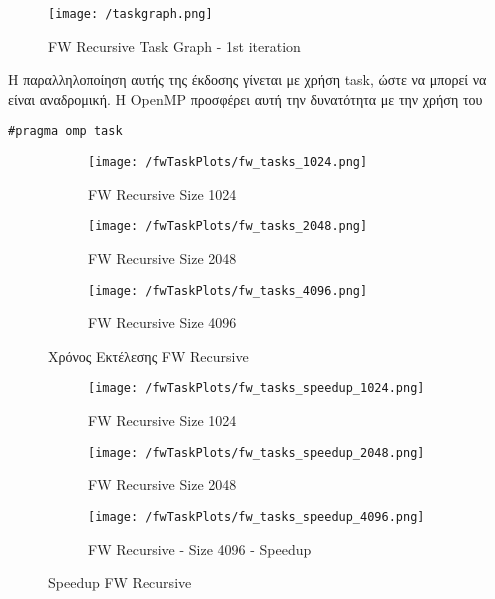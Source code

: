 \documentclass[letterpaper,12pt]{article}
\begin{document}
\begin{figure}[H]
    \centering
    \texttt{[image: /taskgraph.png]}
    \caption{FW Recursive Task Graph - 1st iteration}
    \label{fig:FW Recursive Task Graph}
\end{figure}

Η παραλληλοποίηση αυτής της έκδοσης γίνεται με χρήση task, ώστε να μπορεί να είναι αναδρομική.
Η OpenMP προσφέρει αυτή την δυνατότητα με την χρήση του

\begin{lstlisting}
#pragma omp task
\end{lstlisting}



\begin{figure}[H]
    \centering
    \begin{subfigure}[b]{0.45\linewidth}
        \texttt{[image: /fwTaskPlots/fw\_tasks\_1024.png]}
        \caption{FW Recursive Size 1024}
    \end{subfigure}
    \begin{subfigure}[b]{0.45\linewidth}
        \texttt{[image: /fwTaskPlots/fw\_tasks\_2048.png]}
        \caption{FW Recursive Size 2048}
    \end{subfigure}
    \begin{subfigure}[b]{0.5\linewidth}
        \texttt{[image: /fwTaskPlots/fw\_tasks\_4096.png]}
        \caption{FW Recursive Size 4096}
    \end{subfigure}
    \caption{Χρόνος Εκτέλεσης FW Recursive}
    \label{fig:Χρόνος Εκτέλεσης FW Recursive}
\end{figure}

\begin{figure}[H]
    \centering
    \begin{subfigure}[b]{0.48\linewidth}
        \texttt{[image: /fwTaskPlots/fw\_tasks\_speedup\_1024.png]}
        \caption{FW Recursive Size 1024}
    \end{subfigure}
    \begin{subfigure}[b]{0.48\linewidth}
        \texttt{[image: /fwTaskPlots/fw\_tasks\_speedup\_2048.png]}
        \caption{FW Recursive Size 2048}
    \end{subfigure}
    \begin{subfigure}[b]{0.5\linewidth}
        \texttt{[image: /fwTaskPlots/fw\_tasks\_speedup\_4096.png]}
        \caption{FW Recursive - Size 4096 - Speedup}
    \end{subfigure}
    \caption{Speedup FW Recursive}
    \label{fig:Speedup FW Recursive}
\end{figure}
\end{document}
